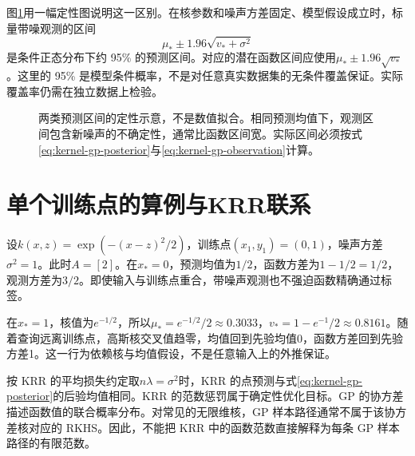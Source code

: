 图\ref{fig:kernel-gp-variance}用一幅定性图说明这一区别。在核参数和噪声方差固定、模型假设成立时，标量带噪观测的区间
\[
 \mu_*\pm1.96\sqrt{v_*+\sigma^2}
\]
是条件正态分布下约 95\% 的预测区间。对应的潜在函数区间应使用$\mu_*\pm1.96\sqrt{v_*}$。这里的 95\% 是模型条件概率，不是对任意真实数据集的无条件覆盖保证。实际覆盖率仍需在独立数据上检验。
\begin{figure}[htbp]
\centering
{}
\caption{两类预测区间的定性示意，不是数值拟合。相同预测均值下，观测区间包含新噪声的不确定性，通常比函数区间宽。实际区间必须按式\eqref{eq:kernel-gp-posterior}与\eqref{eq:kernel-gp-observation}计算。}
\label{fig:kernel-gp-variance}
\end{figure}

\section{单个训练点的算例与KRR联系}
设$k(x,z)=\exp(-(x-z)^2/2)$，训练点$(x_1,y_1)=(0,1)$，噪声方差$\sigma^2=1$。此时$A=[2]$。在$x_*=0$，预测均值为$1/2$，函数方差为$1-1/2=1/2$，观测方差为$3/2$。即使输入与训练点重合，带噪声观测也不强迫函数精确通过标签。

在$x_*=1$，核值为$e^{-1/2}$，所以$\mu_*=e^{-1/2}/2\approx0.3033$，$v_*=1-e^{-1}/2\approx0.8161$。随着查询远离训练点，高斯核交叉值趋零，均值回到先验均值0，函数方差回到先验方差1。这一行为依赖核与均值假设，不是任意输入上的外推保证。

按 KRR 的平均损失约定取$n\lambda=\sigma^2$时，KRR 的点预测与式\eqref{eq:kernel-gp-posterior}的后验均值相同。KRR 的范数惩罚属于确定性优化目标。GP 的协方差描述函数值的联合概率分布。对常见的无限维核，GP 样本路径通常不属于该协方差核对应的 RKHS。因此，不能把 KRR 中的函数范数直接解释为每条 GP 样本路径的有限范数。

